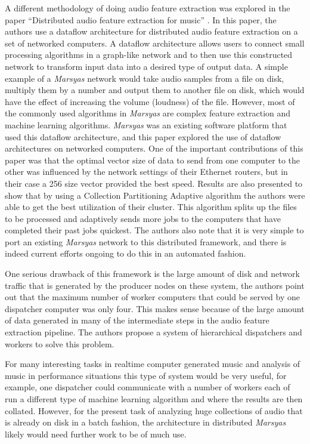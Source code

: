 A different methodology of doing audio feature extraction was explored
in the paper ``Distributed audio feature extraction for music''
\cite{bray2005distributed}.  In this paper, the authors use a dataflow
architecture for distributed audio feature extraction on a set of
networked computers.  A dataflow architecture allows users to connect
small processing algorithms in a graph-like network and to then use
this constructed network to transform input data into a desired type
of output data.  A simple example of a \textit{Marsyas} network would take
audio samples from a file on disk, multiply them by a number and
output them to another file on disk, which would have the effect of
increasing the volume (loudness) of the file.  However, most of the
commonly used algorithms in \textit{Marsyas} are complex feature extraction and
machine learning algorithms.  \textit{Marsyas} was an existing software
platform that used this dataflow architecture, and this paper explored
the use of dataflow architectures on networked computers.  One of the
important contributions of this paper was that the optimal vector size
of data to send from one computer to the other was influenced by the
network settings of their Ethernet routers, but in their case a 256
size vector provided the best speed.  Results are also presented to
show that by using a Collection Partitioning Adaptive algorithm the
authors were able to get the best utilization of their cluster.  This
algorithm splits up the files to be processed and adaptively sends
more jobs to the computers that have completed their past jobs
quickest.  The authors also note that it is very simple to port an
existing \textit{Marsyas} network to this distributed framework, and there is
indeed current efforts ongoing to do this in an automated fashion.

One serious drawback of this framework is the large amount of disk and
network traffic that is generated by the producer nodes on these
system, the authors point out that the maximum number of worker
computers that could be served by one dispatcher computer was only
four.  This makes sense because of the large amount of data generated
in many of the intermediate steps in the audio feature extraction
pipeline.  The authors propose a system of hierarchical dispatchers
and workers to solve this problem.

For many interesting tasks in realtime computer generated music and
analysis of music in performance situations this type of system would
be very useful, for example, one dispatcher could communicate with a
number of workers each of run a different type of machine learning
algorithm and where the results are then collated.  However, for the
present task of analyzing huge collections of audio that is already on
disk in a batch fashion, the architecture in distributed \textit{Marsyas}
likely would need further work to be of much use.

